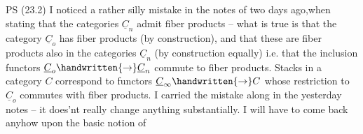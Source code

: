 PS (23.2) I noticed a rather silly mistake in the notes of two days ago,when stating that the categories $\underline{C}_n$ admit fiber products -- what is true is that the category $\underline{C}_o$ has fiber products (by construction), and that these are fiber products also in the categories $\underline{C}_n$ (by construction equally) i.e. that the inclusion functors $\underline{C}_o\handwritten{\to}\underline{C}_n$ commute to fiber products. Stacks in a category $C$ correspond to functors $\underline{C}_{\infty}\handwritten{\to}C$ whose restriction to $\underline{C}_o$ commutes with fiber products. I carried the mistake along in the  yesterday notes -- it does'nt really change anything substantially. I will have to come back anyhow upon the basic notion of 

